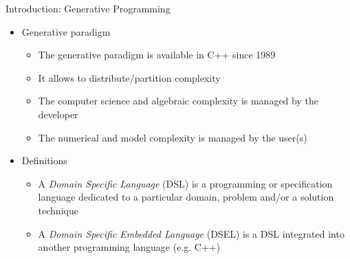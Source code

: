 \documentclass[final,utf8,,hyperref={pdfpagelabels=false}]{beamer}
\newcommand{\inputsnapshot}[1]{
  
}
\begin{document}
\begin{frame}[containsverbatim]{}
\begin{columns}[c]
    \begin{block}{Introduction: Generative Programming}
      \begin{itemize}
      \item Generative paradigm
        \begin{itemize}
        \item The generative paradigm is available in C++ since 1989
        \item It allows to  \alert{distribute/partition complexity}
        \item The computer science and algebraic complexity is managed by the \alert{developer}
        \item The numerical and model complexity is managed by the
          \alert{user(s)}
        \end{itemize}
      \item Definitions
        \begin{itemize}
        \item A \alert{\emph{Domain Specific Language} (DSL)} is a programming or specification language
          dedicated to a particular domain, problem and/or a solution technique
        \item A \alert{\emph{Domain Specific Embedded Language} (DSEL)}
          is a DSL integrated into another programming language (e.g. C++)
        \end{itemize}
      \end{itemize}
    \end{block}
    \vfill


\end{columns}
\end{frame}
\end{document}

